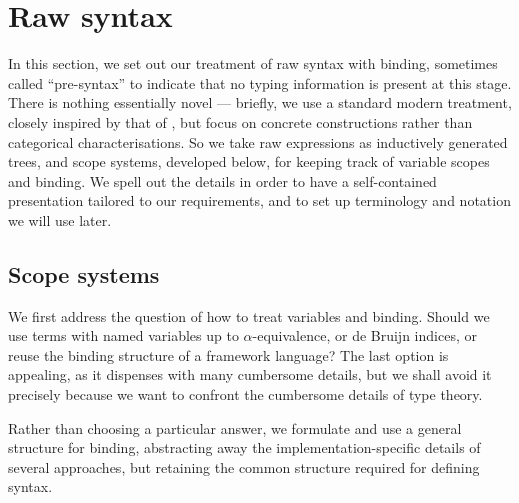 \section{Raw syntax}
\label{sec:raw-syntax}

In this section, we set out our treatment of raw syntax with binding, sometimes called ``pre-syntax'' to indicate that no typing information is present at this stage.
%
There is nothing essentially novel --- briefly, we use a standard modern treatment, closely inspired by that of \citep{fiore-plotkin-turi}, but focus on concrete constructions rather than categorical characterisations.
%
So we take raw expressions as inductively generated trees, and scope systems, developed below, for keeping track of variable scopes and binding.
%
We spell out the details in order to have a self-contained presentation tailored to our requirements, and to set up terminology and notation we will use later.

\subsection{Scope systems}

We first address the question of how to treat variables and binding.
%
Should we use terms with named variables up to $\alpha$-equivalence, or de Bruijn indices, or reuse the binding structure of a framework language?
%
The last option is appealing, as it dispenses with many cumbersome details,
but we shall avoid it precisely because we want to confront the cumbersome details of type theory.
%

Rather than choosing a particular answer, we formulate and use a general structure for binding, abstracting away the implementation-specific details of several approaches, but retaining the common structure required for defining syntax.


